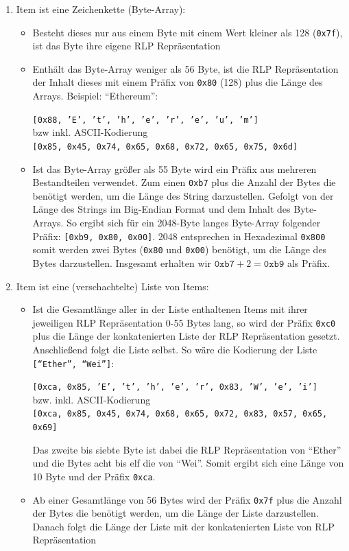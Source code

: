 \documentclass[runningheads]{llncs}
\begin{document}
\begin{enumerate}
  \item Item ist eine Zeichenkette (Byte-Array):
        \begin{itemize}
          \item Besteht dieses nur aus einem Byte mit einem Wert kleiner als 128 (\texttt{0x7f}), ist das Byte ihre eigene RLP Repräsentation
          \item Enthält das Byte-Array weniger als 56 Byte, ist die RLP Repräsentation der Inhalt dieses mit einem Präfix von \texttt{0x80} (128) plus die Länge des Arrays. Beispiel: "`Ethereum"':
                \begin{center}
                  \texttt{[0x88, 'E', 't', 'h', 'e', 'r', 'e', 'u', 'm']}\\
                  bzw inkl. ASCII-Kodierung\\
                  \texttt{[0x85, 0x45, 0x74, 0x65, 0x68, 0x72, 0x65, 0x75, 0x6d]}
                \end{center}
          \item Ist das Byte-Array größer als 55 Byte wird ein Präfix aus mehreren Bestandteilen verwendet. Zum einen \texttt{0xb7} plus die Anzahl der Bytes die benötigt werden, um die Länge des String darzustellen. Gefolgt von der Länge des Strings im Big-Endian Format und dem Inhalt des Byte-Arrays. So ergibt sich für ein 2048-Byte langes Byte-Array folgender Präfix: \texttt{[0xb9, 0x80, 0x00]}.
                2048 entsprechen in Hexadezimal \texttt{0x800} somit werden zwei Bytes (\texttt{0x80} und \texttt{0x00}) benötigt, um die Länge des Bytes darzustellen. Insgesamt erhalten wir $\texttt{0xb7} + 2 = \texttt{0xb9}$ als Präfix.
        \end{itemize}
  \item Item ist eine (verschachtelte) Liste von Items:
        \begin{itemize}
          \item Ist die Gesamtlänge aller in der Liste enthaltenen Items mit ihrer jeweiligen RLP Repräsentation 0-55 Bytes lang, so wird der Präfix \texttt{0xc0} plus die Länge der konkatenierten Liste der RLP Repräsentation gesetzt. Anschließend folgt die Liste selbst. So wäre die Kodierung der Liste \texttt{["`Ether"', "`Wei"']}:
                \begin{center}
                  \texttt{[0xca, 0x85, 'E', 't', 'h', 'e', 'r', 0x83, 'W', 'e', 'i']}\\
                  bzw. inkl. ASCII-Kodierung\\
                  \texttt{[0xca, 0x85, 0x45, 0x74, 0x68, 0x65, 0x72, 0x83, 0x57, 0x65, 0x69]}
                \end{center}
                Das zweite bis siebte Byte ist dabei die RLP Repräsentation von "`Ether"' und die Bytes acht bis elf die von "`Wei"'. Somit ergibt sich eine Länge von 10 Byte und der Präfix \verb+0xca+.
          \item Ab einer Gesamtlänge von 56 Bytes wird der Präfix \texttt{0x7f} plus die Anzahl der Bytes die benötigt werden, um die Länge der Liste darzustellen. Danach folgt die Länge der Liste mit der konkatenierten Liste von RLP Repräsentation
        \end{itemize}
\end{enumerate}
\end{document}
